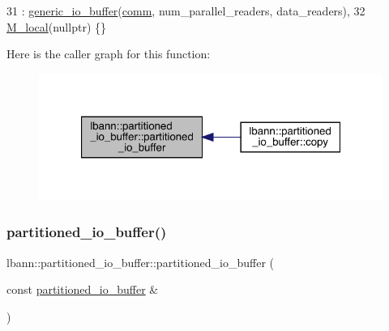 \begin{DoxyCode}
31   : \hyperlink{classlbann_1_1generic__io__buffer_a21e2ef867da6fb0fa334d751ae6b692f}{generic\_io\_buffer}(\hyperlink{file__io_8cpp_ab048c6f9fcbcfaa57ce68b00263dbebe}{comm}, num\_parallel\_readers, data\_readers),
32     \hyperlink{classlbann_1_1partitioned__io__buffer_a80d8916c269b26e605637353abe322b2}{M\_local}(\textcolor{keyword}{nullptr}) \{\}
\end{DoxyCode}
Here is the caller graph for this function\+:\nopagebreak
\begin{figure}[H]
\begin{center}
\leavevmode
\includegraphics[width=321pt]{classlbann_1_1partitioned__io__buffer_a2dd39b740a3c0ea613cef9540d3c3e5d_icgraph}
\end{center}
\end{figure}
\mbox{\label{classlbann_1_1partitioned__io__buffer_a54a675792e2ae8d2ac4bb044b6209dcd}} 
\subsubsection{\texorpdfstring{partitioned\+\_\+io\+\_\+buffer()}{partitioned\_io\_buffer()}\hspace{0.1cm}{\footnotesize\ttfamily [2/2]}}
{\footnotesize\ttfamily lbann\+::partitioned\+\_\+io\+\_\+buffer\+::partitioned\+\_\+io\+\_\+buffer (\begin{DoxyParamCaption}\item[{const \hyperlink{classlbann_1_1partitioned__io__buffer}{partitioned\+\_\+io\+\_\+buffer} \&}]{ }\end{DoxyParamCaption})\hspace{0.3cm}{\ttfamily [default]}}

